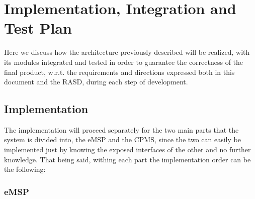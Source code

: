 \documentclass[11pt]{article}
\begin{document}
\section{Implementation, Integration and Test Plan}

Here we discuss how the architecture previously described will be realized, with its modules integrated and tested in order to guarantee the correctness of the final product, w.r.t. the requirements and directions expressed both in this document and the RASD, during each step of development.

\subsection{Implementation}

The implementation will proceed separately for the two main parts that the system is divided into, the eMSP and the CPMS, since the two can easily be implemented just by knowing the exposed interfaces of the other and no further knowledge. That being said, withing each part the implementation order can be the following:

\subsubsection{eMSP}
\end{document}
